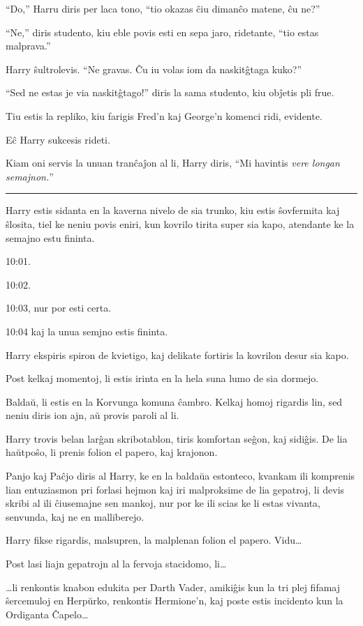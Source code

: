 ``Do,'' Harru diris per laca tono, ``tio okazas ĉiu dimanĉo matene, ĉu
ne?''

``Ne,'' diris studento, kiu eble povis esti en sepa jaro, ridetante,
``tio estas malprava.''

Harry ŝultrolevis. ``Ne gravas. Ĉu iu volas iom da naskitĝtaga kuko?''

``Sed ne estas je via naskitĝtago!'' diris la sama studento, kiu
obĵetis pli frue.

Tiu estis la repliko, kiu farigis Fred'n kaj George'n komenci ridi,
evidente.

Eĉ Harry sukcesis rideti.

Kiam oni servis la unuan tranĉaĵon al li, Harry diris, ``Mi havintis
\emph{vere longan semajnon.}''

\begin{center}\rule{3in}{0.4pt}\end{center}

Harry estis sidanta en la kaverna nivelo de sia trunko, kiu estis
ŝovfermita kaj ŝlosita, tiel ke neniu povis eniri, kun kovrilo tirita
super sia kapo, atendante ke la semajno estu fininta.

10:01.

10:02.

10:03, nur por esti certa.

10:04 kaj la unua semjno estis fininta.

Harry ekspiris spiron de kvietigo, kaj delikate fortiris la kovrilon
desur sia kapo.

Post kelkaj momentoj, li estis irinta en la hela suna lumo de sia
dormejo.

Baldaŭ, li estis en la Korvunga komuna ĉambro. Kelkaj homoj rigardis
lin, sed neniu diris ion ajn, aŭ provis paroli al li.

Harry trovis belan larĝan skribotablon, tiris komfortan seĝon, kaj
sidiĝis. De lia haŭtpoŝo, li prenis folion el papero, kaj krajonon.

Panjo kaj Paĉjo diris al Harry, ke en la baldaŭa estonteco, kvankam
ili komprenis lian entuziasmon pri forlasi hejmon kaj iri malproksime
de lia gepatroj, li devis skribi al ili ĉiusemajne sen mankoj, nur por
ke ili scias ke li estas vivanta, senvunda, kaj ne en malliberejo.

Harry fikse rigardis, malsupren, la malplenan folion el papero. Vidu\ldots

Post lasi liajn gepatrojn al la fervoja stacidomo, li\ldots

\ldots li renkontis knabon edukita per Darth Vader, amikiĝis kun la
tri plej fifamaj ŝercemuloj en Herpŭrko, renkontis Hermione'n, kaj
poste estis incidento kun la Ordiganta Ĉapelo\ldots

